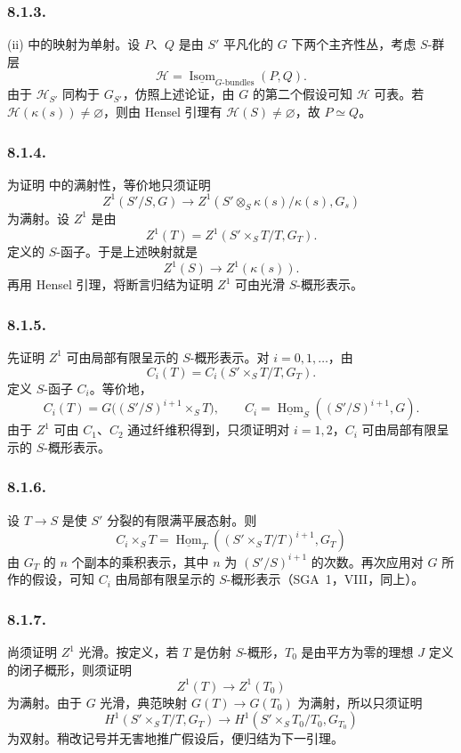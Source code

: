 \subsubsection*{8.1.3.}
(ii) 中的映射为单射。设 \(P\)、\(Q\) 是由 \(S'\) 平凡化的 \(G\) 下两个主齐性丛，考虑 \(S\)-群层
\[
  \mathcal H=
  \underline{\operatorname{Isom}}_{G\text{-}\mathrm{bundles}}(P,Q).
\]
由于 \(\mathcal H_{S'}\) 同构于 \(G_{S'}\)，仿照上述论证，由 \(G\) 的第二个假设可知 \(\mathcal H\) 可表。若 \(\mathcal H(\kappa(s))\neq\varnothing\)，则由 Hensel 引理有 \(\mathcal H(S)\neq\varnothing\)，故 \(P\simeq Q\)。

\subsubsection*{8.1.4.}
为证明  中的满射性，等价地只须证明
\[
  Z^1(S'/S,G)
  \longrightarrow
  Z^1(S'\otimes_S\kappa(s)/\kappa(s),G_s)
\]
为满射。设 \(Z^1\) 是由
\[
  Z^1(T)=Z^1(S'\times_ST/T,G_T).
\]
定义的 \(S\)-函子。于是上述映射就是
\[
  Z^1(S)\longrightarrow Z^1(\kappa(s)).
\]
再用 Hensel 引理，将断言归结为证明 \(Z^1\) 可由光滑 \(S\)-概形表示。

\subsubsection*{8.1.5.}
先证明 \(Z^1\) 可由局部有限呈示的 \(S\)-概形表示。对 \(i=0,1,\ldots\)，由
\[
  C_i(T)=C_i(S'\times_ST/T,G_T).
\]
定义 \(S\)-函子 \(C_i\)。等价地，
\[
  C_i(T)
  =
  G\bigl((S'/S)^{i+1}\times_ST\bigr),
  \qquad
  C_i
  =
  \underline{\operatorname{Hom}}_S((S'/S)^{i+1},G).
\]
由于 \(Z^1\) 可由 \(C_1\)、\(C_2\) 通过纤维积得到，只须证明对 \(i=1,2\)，\(C_i\) 可由局部有限呈示的 \(S\)-概形表示。

\subsubsection*{8.1.6.}
设 \(T\to S\) 是使 \(S'\) 分裂的有限满平展态射。则
\[
  C_i\times_ST
  =
  \underline{\operatorname{Hom}}_T
    ((S'\times_ST/T)^{i+1},G_T)
\]
由 \(G_T\) 的 \(n\) 个副本的乘积表示，其中 \(n\) 为 \((S'/S)^{i+1}\) 的次数。再次应用对 \(G\) 所作的假设，可知 \(C_i\) 由局部有限呈示的 \(S\)-概形表示（SGA~1，VIII，同上）。

\subsubsection*{8.1.7.}
尚须证明 \(Z^1\) 光滑。按定义，若 \(T\) 是仿射 \(S\)-概形，\(T_0\) 是由平方为零的理想 \(J\) 定义的闭子概形，则须证明
\[
  Z^1(T)\longrightarrow Z^1(T_0)
\]
为满射。由于 \(G\) 光滑，典范映射 \(G(T)\to G(T_0)\) 为满射，所以只须证明
\[
  H^1(S'\times_ST/T,G_T)
  \longrightarrow
  H^1(S'\times_ST_0/T_0,G_{T_0})
\]
为双射。稍改记号并无害地推广假设后，便归结为下一引理。

